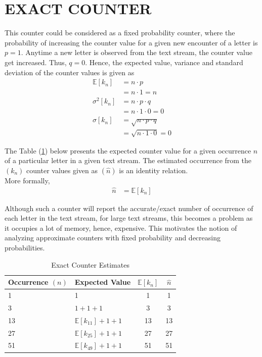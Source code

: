 \documentclass[longpaper, english, final, times]{revdetua}
\begin{document}
	 	
	\section{EXACT COUNTER}
		This counter could be considered as a fixed probability counter, where the probability of increasing the counter value for a given new encounter of a letter is $p=1$. Anytime a new letter is observed from the text stream, the counter value get increased. Thus, $q=0$.
		Hence, the expected value, variance and standard deviation of the counter values is given as
		\begin{align*}
			\mathbb{E}[k_n] &= n\cdot p\\
			&=n\cdot 1=n \\
			\sigma^2[k_n] &= n\cdot p\cdot q\\
			&=n\cdot 1 \cdot 0=0 \\
			\sigma[k_n] &= \sqrt{n\cdot p\cdot q}\\
			&=\sqrt{n\cdot 1\cdot 0}=0
		\end{align*}
		
		The Table (\ref{table:exactCounterExpectedEstimate}) below presents the expected counter value for a given occurrence $n$ of a particular letter in a given text stream. The estimated occurrence from the $(k_n)$ counter values given as $(\widehat{n})$ is an identity relation.\\
		More formally,
		\begin{align*}
			\widehat{n} &= \mathbb{E}[k_n]
		\end{align*}
		
		Although such a counter will report the accurate/exact number of occurrence of each letter in the text stream, for large text streams, this becomes a problem as it occupies a lot of memory, hence, expensive. This motivates the notion of analyzing approximate counters with fixed probability and decreasing probabilities.
		\begin{table}[ht!]
			\begin{center}
				\label{table:exactCounterExpectedEstimate}
				\caption{Exact Counter Estimates}	
				{\def\arraystretch{2}%
					\begin{tabular}{l|l|c|c}
						\toprule
						Occurrence $(n)$ & Expected Value& $\mathbb{E}[k_n]$ & $\hat{n}$\\
						\hline
						1 & 1 & 1 & 1\\
						3 & $1+1+1$&3 & 3\\
						13 & $\mathbb{E}[k_{11}]+1+1$&13& 13\\
						27 & $\mathbb{E}[k_{25}]+1+1$&27 & 27\\
						51 & $\mathbb{E}[k_{49}]+1+1$&51 & 51\\
						\bottomrule
					\end{tabular}
				}
			\end{center}
		\end{table}
	 	
\end{document}
